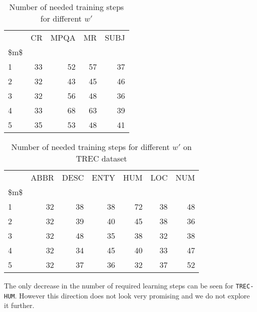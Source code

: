 \begin{table}[H]
\begin{center}

\begin{tabular}{lrrrr}
\toprule
{} & CR & MPQA & MR & SUBJ \\
\$m\$ &      &       &      &       \\
\midrule
1  &     33 &      52 &     57 &      37 \\
2  &     32 &      43 &     45 &      46 \\
3  &     32 &      56 &     48 &      36 \\
4  &     33 &      68 &     63 &      39 \\
5  &     35 &      53 &     48 &      41 \\
\bottomrule
\end{tabular}

\caption[Number of needed training steps for different $w'$]{Number of needed training steps for different $w'$}
\label{tab:multyw:steps}
\end{center}
\end{table}


\begin{table}[H]
\begin{center}

\begin{tabular}{lrrrrrr}
\toprule
{} & ABBR & DESC & ENTY & HUM & LOC & NUM \\
\$m\$ &          &          &          &         &         &         \\
\midrule
1  &        32 &        38 &        38 &        72 &        38 &        48 \\
2  &        32 &        39 &        40 &        45 &        38 &        36 \\
3  &        32 &        48 &        35 &        38 &        32 &        38 \\
4  &        32 &        34 &        45 &        40 &        33 &        47 \\
5  &        32 &        37 &        36 &        32 &        37 &        52 \\
\bottomrule
\end{tabular}

\caption[Number of needed training steps for different $w'$ on TREC dataset]{Number of needed training steps for different $w'$ on TREC dataset}
\label{tab:multyw:steps:trec}
\end{center}
\end{table}

    The only decrease in the number of required learning steps can be seen for \texttt{TREC-HUM}.
    However this direction does not look very promising and we do not explore it further.
    